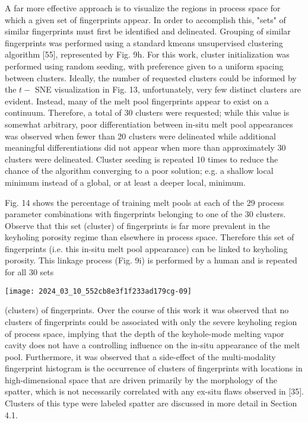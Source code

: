 \documentclass[10pt]{article}
\begin{document}
A far more effective approach is to visualize the regions in process space for which a given set of fingerprints appear. In order to accomplish this, "sets" of similar fingerprints must first be identified and delineated. Grouping of similar fingerprints was performed using a standard kmeans unsupervised clustering algorithm [55], represented by Fig. 9h. For this work, cluster initialization was performed using random seeding, with preference given to a uniform spacing between clusters. Ideally, the number of requested clusters could be informed by the $t-$ SNE visualization in Fig. 13, unfortunately, very few distinct clusters are evident. Instead, many of the melt pool fingerprints appear to exist on a continuum. Therefore, a total of 30 clusters were requested; while this value is somewhat arbitrary, poor differentiation between in-situ melt pool appearances was observed when fewer than 20 clusters were delineated while additional meaningful differentiations did not appear when more than approximately 30 clusters were delineated. Cluster seeding is repeated 10 times to reduce the chance of the algorithm converging to a poor solution; e.g. a shallow local minimum instead of a global, or at least a deeper local, minimum.

Fig. 14 shows the percentage of training melt pools at each of the 29 process parameter combinations with fingerprints belonging to one of the 30 clusters. Observe that this set (cluster) of fingerprints is far more prevalent in the keyholing porosity regime than elsewhere in process space. Therefore this set of fingerprints (i.e. this in-situ melt pool appearance) can be linked to keyholing porosity. This linkage process (Fig. 9i) is performed by a human and is repeated for all 30 sets

\begin{center}
\texttt{[image: 2024\_03\_10\_552cb8e3f1f233ad179cg-09]}
\end{center}

(clusters) of fingerprints. Over the course of this work it was observed that no clusters of fingerprints could be associated with only the severe keyholing region of process space, implying that the depth of the keyhole-mode melting vapor cavity does not have a controlling influence on the in-situ appearance of the melt pool. Furthermore, it was observed that a side-effect of the multi-modality fingerprint histogram is the occurrence of clusters of fingerprints with locations in high-dimensional space that are driven primarily by the morphology of the spatter, which is not necessarily correlated with any ex-situ flaws observed in [35]. Clusters of this type were labeled spatter are discussed in more detail in Section 4.1.
\end{document}
